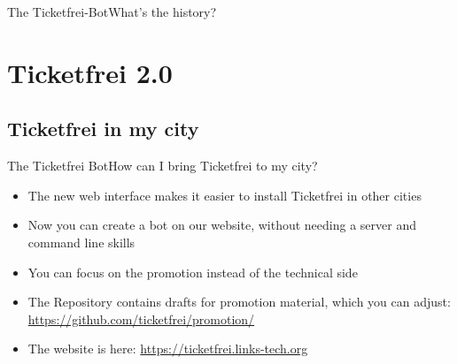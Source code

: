 \documentclass[10pt]{beamer}
\begin{document}
{\begin{frame}{The Ticketfrei-Bot}{What's the history?}
\end{frame}

\section{Ticketfrei 2.0}
\subsection{Ticketfrei in my city}
\begin{frame}{The Ticketfrei Bot}{How can I bring Ticketfrei to my city?}

\begin{itemize}
  \item<1-> The new web interface makes it easier to install Ticketfrei in other cities
  \item<1-> Now you can create a bot on our website, without needing a server and command line skills
  \item<1-> You can focus on the promotion instead of the technical side
  \item<1-> The Repository contains drafts for promotion material, which you can adjust: \url{https://github.com/ticketfrei/promotion/}
  \item<1-> The website is here: \url{https://ticketfrei.links-tech.org}
\end{itemize}

\end{frame}

}
\end{document}
